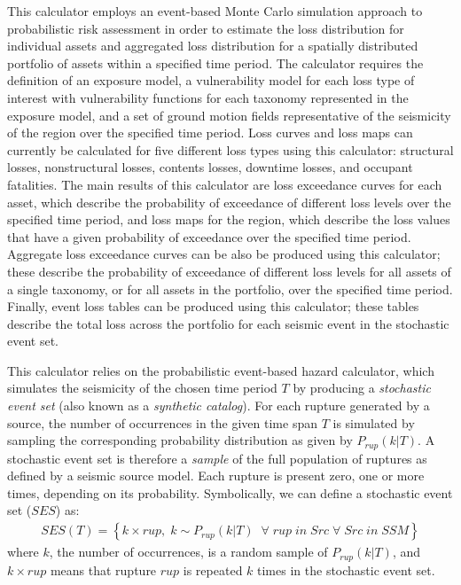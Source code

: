 This calculator employs an event-based Monte Carlo simulation approach to
probabilistic risk assessment in order to estimate the loss distribution for
individual assets and aggregated loss distribution for a spatially distributed
portfolio of assets within a specified time period. The calculator requires
the definition of an exposure model, a vulnerability model for each loss type
of interest with vulnerability functions for each taxonomy represented in the
exposure model, and a set of ground motion fields representative of the
seismicity of the region over the specified time period. Loss curves and loss
maps can currently be calculated for five different loss types using this
calculator: structural losses, nonstructural losses, contents losses, downtime
losses, and occupant fatalities. The main results of this calculator are loss
exceedance curves for each asset, which describe the probability of exceedance
of different loss levels over the specified time period, and loss maps for the
region, which describe the loss values that have a given probability of
exceedance over the specified time period. Aggregate loss exceedance curves
can be also be produced using this calculator; these describe the probability
of exceedance of different loss levels for all assets of a single taxonomy, or
for all assets in the portfolio, over the specified time period. Finally,
event loss tables can be produced using this calculator; these tables describe
the total loss across the portfolio for each seismic event in the stochastic
event set.

This calculator relies on the probabilistic event-based hazard calculator,
which simulates the seismicity of the chosen time period $T$ by producing a
\textit{stochastic event set} (also known as a \textit{synthetic catalog}).
For each rupture generated by a source, the number of occurrences in the given
time span $T$ is simulated by sampling the corresponding probability
distribution as given by $P_{rup}(k | T)$. A stochastic event set is therefore
a \textit{sample} of the full population of ruptures as defined by a seismic
source model. Each rupture is present zero, one or more times, depending on
its probability. Symbolically, we can define a stochastic event set ($SES$)
as:
\begin{align}
SES(T) = \left\{k \times rup,\;k\sim P_{rup}(k | T)\;\;\forall\;rup\;in\;Src\;\forall\;Src\;in\;SSM\right\}
\end{align}
where $k$, the number of occurrences, is a random sample of $P_{rup}(k | T)$,
and $k \times rup$ means that rupture $rup$ is repeated $k$ times in the
stochastic event set.

